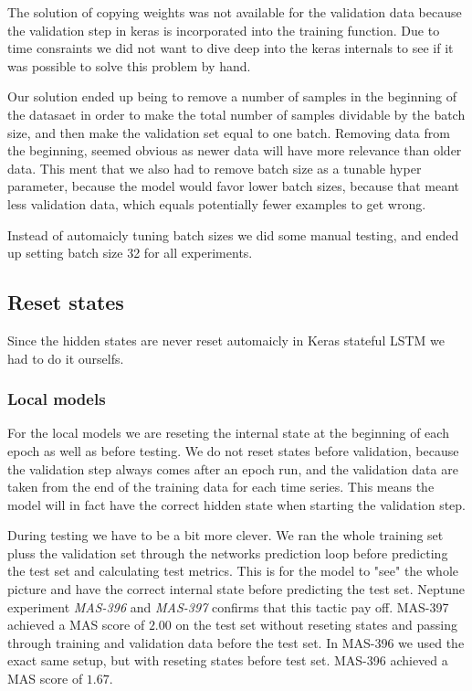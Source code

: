 The solution of copying weights was not available for the validation data
because the validation step in keras is incorporated into the training function.
Due to time consraints we did not want to dive deep into the keras internals
to see if it was possible to solve this problem by hand.

Our solution ended up being to remove a number of samples in the beginning of
the datasaet in order to make the total number of samples dividable by the batch size,
and then make the validation set equal to one batch. Removing data from the beginning,
seemed obvious as newer data will have more relevance than older data.
This ment that we also had to remove batch size as a tunable hyper parameter,
because the model would favor lower batch sizes, because that meant less validation data,
which equals potentially fewer examples to get wrong.

Instead of automaicly tuning batch sizes we did some manual testing, and
ended up setting batch size 32 for all experiments.


\subsection*{Reset states}
Since  the hidden states are never reset automaicly in Keras stateful LSTM
we had to do it ourselfs.

\subsubsection{Local models}
For the local models we are reseting the internal state at the beginning
of each epoch as well as before testing. We do not reset states before validation,
because the validation step always comes after an epoch run, and the
validation data are taken from the end of the training data for each time series.
This means the model will in fact have the correct hidden state when starting the validation step.

During testing we have to be a bit more clever. We ran the whole training set pluss
the validation set through the networks prediction loop before predicting the test
set and calculating test metrics.
This is for the model to "see" the whole picture and have the correct
internal state before predicting the test set.
Neptune experiment \textit{MAS-396} and \textit{MAS-397} confirms
that this tactic pay off. MAS-397 achieved a MAS score of $2.00$ on the test set
without reseting states and passing through training and validation data before
the test set. In MAS-396 we used the exact same setup, but with reseting states
before test set. MAS-396 achieved a MAS score of $1.67$.

